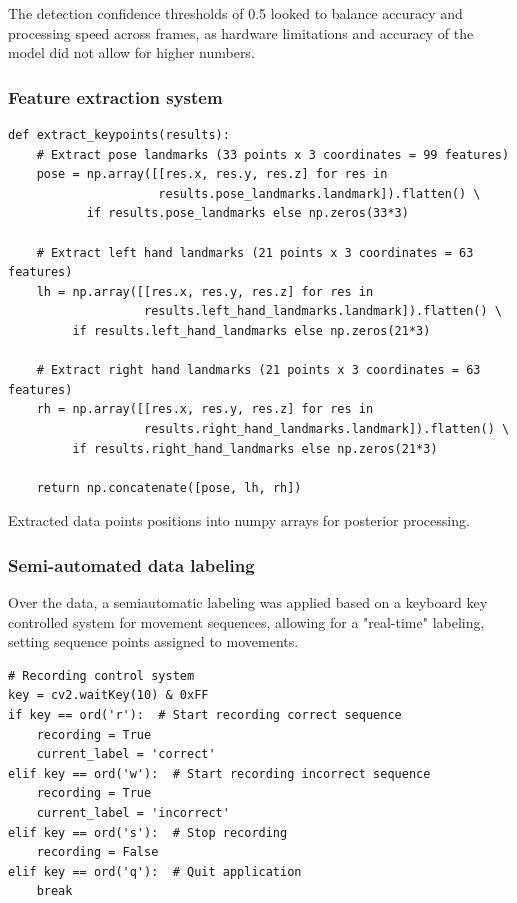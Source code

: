 The detection confidence thresholds of 0.5 looked to balance accuracy and processing speed across frames, as hardware limitations and accuracy of the model did not allow for higher numbers.

\subsubsection{Feature extraction system}

\begin{verbatim}
def extract_keypoints(results):
    # Extract pose landmarks (33 points x 3 coordinates = 99 features)
    pose = np.array([[res.x, res.y, res.z] for res in 
                     results.pose_landmarks.landmark]).flatten() \
           if results.pose_landmarks else np.zeros(33*3)
    
    # Extract left hand landmarks (21 points x 3 coordinates = 63 features)
    lh = np.array([[res.x, res.y, res.z] for res in 
                   results.left_hand_landmarks.landmark]).flatten() \
         if results.left_hand_landmarks else np.zeros(21*3)
    
    # Extract right hand landmarks (21 points x 3 coordinates = 63 features)
    rh = np.array([[res.x, res.y, res.z] for res in 
                   results.right_hand_landmarks.landmark]).flatten() \
         if results.right_hand_landmarks else np.zeros(21*3)
    
    return np.concatenate([pose, lh, rh])
\end{verbatim}

Extracted data points positions into numpy arrays for posterior processing.

\subsubsection{Semi-automated data labeling}

Over the data, a semiautomatic labeling was applied based on a keyboard key controlled system for movement sequences, allowing for a "real-time" labeling, setting sequence points assigned to movements.

\begin{verbatim}
# Recording control system
key = cv2.waitKey(10) & 0xFF
if key == ord('r'):  # Start recording correct sequence
    recording = True
    current_label = 'correct'
elif key == ord('w'):  # Start recording incorrect sequence
    recording = True
    current_label = 'incorrect'
elif key == ord('s'):  # Stop recording
    recording = False
elif key == ord('q'):  # Quit application
    break
\end{verbatim}

